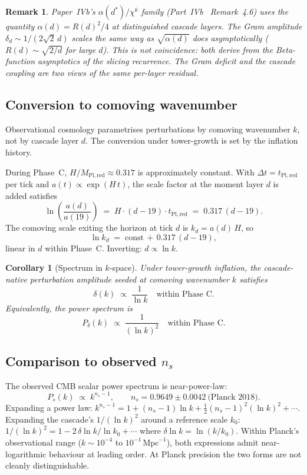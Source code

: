 \documentclass[12pt,a4paper]{article}
\newtheorem{corollary}[theorem]{Corollary}
\newtheorem*{remark}{Remark}
\begin{document}
\begin{remark}
Paper~IVb's $\alpha(d^*)/\chi^k$ family (Part~IVb~\cite{part4b} Remark~4.6)
uses the quantity $\alpha(d) = R(d)^2/4$ at distinguished cascade layers. The
Gram amplitude $\delta_d \sim 1/(2\sqrt{2}\,d)$ scales the same way as
$\sqrt{\alpha(d)}$ does asymptotically ($R(d) \sim \sqrt{2/d}$ for large $d$).
This is not coincidence: both derive from the Beta-function asymptotics of the
slicing recurrence. The Gram deficit and the cascade coupling are two views of
the same per-layer residual.
\end{remark}

\subsection{Conversion to comoving wavenumber}

Observational cosmology parametrises perturbations by comoving wavenumber $k$,
not by cascade layer $d$. The conversion under tower-growth is set by the
inflation history.

During Phase~C, $H / M_{\mathrm{Pl,red}} \approx 0.317$ is approximately
constant. With $\Delta t = t_{\mathrm{Pl,red}}$ per tick and
$a(t) \propto \exp(H\,t)$, the scale factor at the moment layer $d$ is added
satisfies
\[
\ln\!\left(\frac{a(d)}{a(19)}\right) \;=\; H \cdot (d - 19) \cdot t_{\mathrm{Pl,red}}
\;=\; 0.317\,(d - 19).
\]
The comoving scale exiting the horizon at tick $d$ is $k_d = a(d)\,H$, so
\[
\ln k_d \;=\; \mathrm{const} \,+\, 0.317\,(d - 19),
\]
linear in $d$ within Phase~C. Inverting: $d \propto \ln k$.

\begin{corollary}[Spectrum in $k$-space]\label{cor:kspectrum}
Under tower-growth inflation, the cascade-native perturbation amplitude seeded
at comoving wavenumber $k$ satisfies
\[
\delta(k) \;\propto\; \frac{1}{\ln k} \quad\text{within Phase~C.}
\]
Equivalently, the power spectrum is
\[
P_\delta(k) \;\propto\; \frac{1}{(\ln k)^2} \quad\text{within Phase~C.}
\]
\end{corollary}

\subsection{Comparison to observed \texorpdfstring{$n_s$}{n\_s}}

The observed CMB scalar power spectrum is near-power-law:
\[
P_s(k) \;\propto\; k^{n_s - 1}, \qquad n_s = 0.9649 \pm 0.0042\ \text{(Planck 2018).}
\]
Expanding a power law: $k^{n_s - 1} = 1 + (n_s - 1)\ln k + \tfrac{1}{2}(n_s - 1)^2(\ln k)^2 + \cdots$. Expanding the cascade's $1/(\ln k)^2$ around a reference scale
$k_0$: $1/(\ln k)^2 = 1 - 2\,\delta\!\ln k / \ln k_0 + \cdots$ where
$\delta\!\ln k = \ln(k/k_0)$. Within Planck's observational range
($k \sim 10^{-4}$ to $10^{-1}\,\mathrm{Mpc}^{-1}$), both expressions admit
near-logarithmic behaviour at leading order. At Planck precision the two forms
are not cleanly distinguishable.
\end{document}
